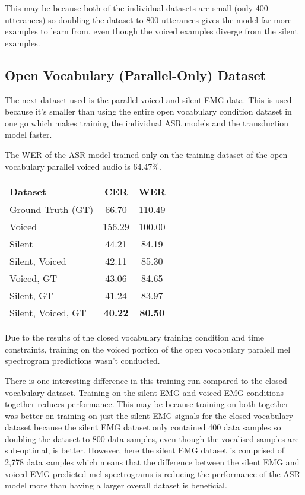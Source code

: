 This may be because both of the
individual datasets are small (only 400 utterances) so doubling the dataset to
800 utterances gives the model far more examples to learn from, even though the
voiced examples diverge from the silent examples.

\subsection{Open Vocabulary (Parallel-Only) Dataset}

The next dataset used is the parallel voiced and silent EMG data. This is used because
it's smaller than using the entire open vocabulary condition dataset in one go which
makes training the individual ASR models and the transduction model faster.

The WER of the ASR model trained only on the
training dataset of the open vocabulary parallel voiced audio is 64.47\%.

{\small\begin{center}
\begin{tabular} {  l  c  c  }
\hline
\textbf{Dataset} & \textbf{CER} & \textbf{WER} \\
\hline
Ground Truth (GT) & 66.70 & 110.49 \\
Voiced & 156.29 & 100.00 \\
Silent & 44.21 & 84.19 \\
Silent, Voiced & 42.11 & 85.30 \\
Voiced, GT & 43.06 & 84.65 \\
Silent, GT & 41.24 & 83.97 \\
\hline
Silent, Voiced, GT & \textbf{40.22} & \textbf{80.50} \\
\hline
\end{tabular}
\end{center}}

Due to the results of the closed vocabulary training condition and time constraints,
training on the voiced portion of the open vocabulary paralell mel spectrogram
predictions wasn't conducted.

There is one interesting difference in this training run compared to the closed
vocabulary dataset. Training on the silent EMG and voiced EMG conditions together
reduces performance. This may be because training on both together was better
on training on just the silent EMG signals for the closed vocabulary dataset
because the silent EMG dataset only contained 400 data samples so doubling
the dataset to 800 data samples, even though the vocalised samples are sub-optimal,
is better. However, here the silent EMG dataset is comprised of 2,778 data samples
which means that the difference between the silent EMG and voiced EMG predicted
mel spectrograms is reducing the performance of the ASR model more than having a
larger overall dataset is beneficial.